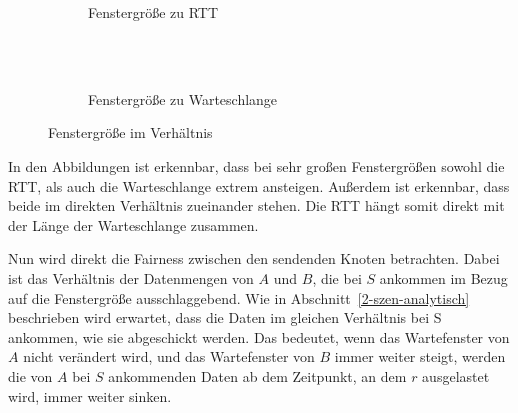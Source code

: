 \documentclass [10pt,a4paper]{article}
\begin{document}
		\begin{figure}[htb]
			\begin{subfigure}[a]{1.0\textwidth}
				\caption[Fenstergröße zu RTT]{Fenstergröße zu RTT}
				\label{fig:winsize-rtt}
			\end{subfigure}\\[2ex]
			~
			\begin{subfigure}[b]{1.0\textwidth}
				\caption[Fenstergröße zu Warteschlange]{Fenstergröße zu Warteschlange}
				\label{fig:winsize-queue}
			\end{subfigure}
			\caption[Fenstergröße im Verhältnis]{Fenstergröße im Verhältnis}
			\label{fig:winsize}
		\end{figure}
		
		In den Abbildungen ist erkennbar, dass bei sehr großen Fenstergrößen sowohl die RTT, als auch die Warteschlange extrem ansteigen. Außerdem ist erkennbar, dass beide im direkten Verhältnis zueinander stehen. Die RTT hängt somit direkt mit der Länge der Warteschlange zusammen.
		
		Nun wird direkt die Fairness zwischen den sendenden Knoten betrachten. Dabei ist das Verhältnis der Datenmengen von $A$ und $B$, die bei $S$ ankommen im Bezug auf die Fenstergröße ausschlaggebend. Wie in Abschnitt~\ref{2-szen-analytisch} beschrieben wird erwartet, dass die Daten im gleichen Verhältnis bei S ankommen, wie sie abgeschickt werden. Das bedeutet, wenn das Wartefenster von $A$ nicht verändert wird, und das Wartefenster von $B$ immer weiter steigt, werden die von $A$ bei $S$ ankommenden Daten ab dem Zeitpunkt, an dem $r$ ausgelastet wird, immer weiter sinken.
		
\end{document}
